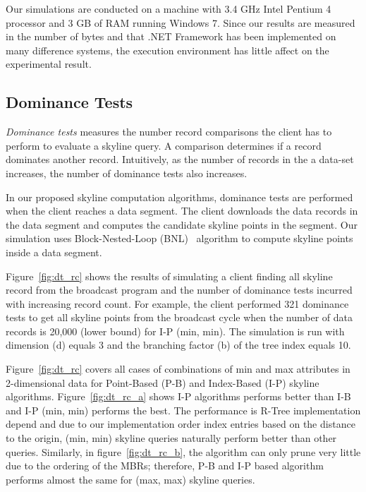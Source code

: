 Our simulations are conducted on a machine with 3.4 GHz Intel
Pentium 4 processor and 3 GB of RAM running Windows 7. Since our results are
measured in the number of bytes and that .NET Framework
has been implemented on many difference systems, the execution environment
has little affect on the experimental result.

\subsection{Dominance Tests}\label{sec:exp_dom_test}

\emph{Dominance tests} measures the number record comparisons the client
has to perform to evaluate a skyline query. A comparison determines if
a record dominates another record. Intuitively, as the number of records in
the a data-set increases, the number of dominance tests also increases.

In our proposed skyline computation algorithms, dominance tests are performed
when the client reaches a data segment. The client downloads the data records
in the data segment and computes the candidate skyline points in the segment.
Our simulation uses Block-Nested-Loop (BNL)~\cite{skyline_operator} algorithm
to compute skyline points inside a data segment.

Figure~\ref{fig:dt_rc} shows the results of simulating a client finding
all skyline record from the broadcast program and the number of dominance
tests incurred with increasing record count. For example, the client
performed 321 dominance tests to get all skyline points from the broadcast
cycle when the number of data records is 20,000 (lower bound) for I-P
(min, min). The simulation is run with dimension (d) equals 3 and the
branching factor (b) of the tree index equals 10.

Figure~\ref{fig:dt_rc} covers all cases of combinations of min and max
attributes in 2-dimensional data for Point-Based (P-B) and Index-Based
(I-P) skyline algorithms.
Figure~\ref{fig:dt_rc_a} shows I-P algorithms performs better than I-B
and I-P (min, min) performs the best. The performance is R-Tree
implementation depend and due to our implementation order index entries
based on the distance to the origin, (min, min) skyline queries naturally
perform better than other queries. Similarly, in figure~\ref{fig:dt_rc_b},
the algorithm can only prune very little due to the ordering of the
MBRs; therefore, P-B and I-P based algorithm performs almost the same
for (max, max) skyline queries.

